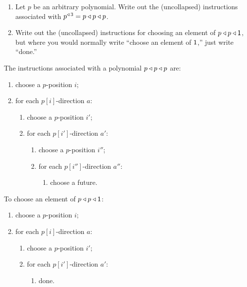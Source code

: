 \documentclass[Book-Poly]{subfiles}
\begin{document}
\begin{exercise}
\begin{enumerate}
	\item Let $p$ be an arbitrary polynomial. Write out the (uncollapsed) instructions associated with $p^{\mathbin{\triangleleft}\,3}=p\mathbin{\triangleleft} p\mathbin{\triangleleft} p$.
	\item Write out the (uncollapsed) instructions for choosing an element of $p\mathbin{\triangleleft} p\mathbin{\triangleleft}\textsf{1}$, but where you would normally write ``choose an element of $\textsf{1}$,'' just write ``done.'' \qedhere
\end{enumerate}
\begin{solution}
\begin{longenum}
    \item The instructions associated with a polynomial $p\mathbin{\triangleleft} p\mathbin{\triangleleft} p$ are:
    \begin{enumerate}
        \item choose a $p$-position $i$;
        \item for each $p[i]$-direction $a$:
        \begin{enumerate}[label*=\arabic*.]
            \item choose a $p$-position $i'$;
            \item for each $p[i']$-direction $a'$:
            \begin{enumerate}[label*=\arabic*.]
                \item choose a $p$-position $i''$;
                \item for each $p[i'']$-direction $a''$:
                \begin{enumerate}[label*=\arabic*.]
                    \item choose a future.
                \end{enumerate}
            \end{enumerate}
        \end{enumerate}
    \end{enumerate}
    \item To choose an element of $p\mathbin{\triangleleft} p\mathbin{\triangleleft}\textsf{1}$:
    \begin{enumerate}
        \item choose a $p$-position $i$;
        \item for each $p[i]$-direction $a$:
        \begin{enumerate}[label*=\arabic*.]
            \item choose a $p$-position $i'$;
            \item for each $p[i']$-direction $a'$:
            \begin{enumerate}[label*=\arabic*.]
                \item done.
            \end{enumerate}
        \end{enumerate}
    \end{enumerate}
\end{longenum}

\end{solution}
\end{exercise}
\end{document}
